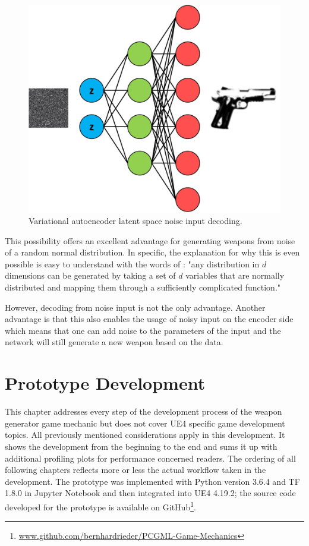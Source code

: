 \documentclass[MGS,Master,english]{twbook}%
\begin{document}
\begin{figure}[!htbp]
	\centering
	\includegraphics[width=0.7\linewidth]{PICs/NNs/variational_autoencoder_noise_decoding}
	\caption{Variational autoencoder latent space noise input decoding.} \label{fig::vae_noise_decoding}
\end{figure}

This possibility offers an excellent advantage for generating weapons from noise of a random normal distribution. In specific, the explanation for why this is even possible is easy to understand with the words of \citep[p. 6]{ml::vae::tutorial}: "any distribution in $d$ dimensions can be generated by taking a set of $d$ variables that are normally distributed and mapping them through a sufficiently complicated function."

However, decoding from noise input is not the only advantage. Another advantage is that this also enables the usage of noisy input on the encoder side which means that one can add noise to the parameters of the input and the network will still generate a new weapon based on the data. 


%
%
\clearpage
\chapter{Prototype Development}
This chapter addresses every step of the development process of the weapon generator game mechanic but does not cover UE4 specific game development topics. All previously mentioned considerations apply in this development. It shows the development from the beginning to the end and sums it up with additional profiling plots for performance concerned readers. The ordering of all following chapters reflects more or less the actual workflow taken in the development. The prototype was implemented with Python version 3.6.4 and TF 1.8.0 in Jupyter Notebook and then integrated into UE4 4.19.2; the source code developed for the prototype is available on GitHub\footnote{\url{www.github.com/bernhardrieder/PCGML-Game-Mechanics}}. 
\end{document}
